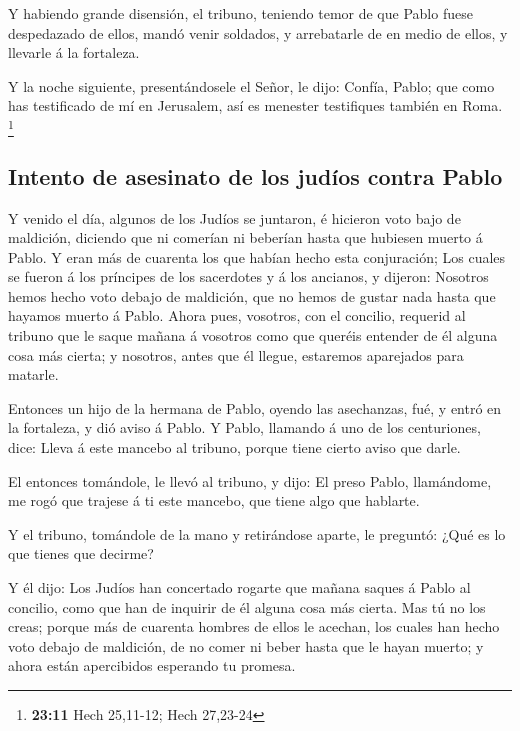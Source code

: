  Y habiendo grande disensión, el tribuno, teniendo temor de
que Pablo fuese despedazado de ellos, mandó venir soldados, y
arrebatarle de en medio de ellos, y llevarle á la fortaleza.

 Y la noche siguiente, presentándosele el Señor, le dijo:
Confía, Pablo; que como has testificado de mí en Jerusalem, así es
menester testifiques también en Roma. \footnote{\textbf{23:11} Hech
  25,11-12; Hech 27,23-24}

\hypertarget{intento-de-asesinato-de-los-juduxedos-contra-pablo}{%
\subsection{Intento de asesinato de los judíos contra
Pablo}\label{intento-de-asesinato-de-los-juduxedos-contra-pablo}}

 Y venido el día, algunos de los Judíos se juntaron, é
hicieron voto bajo de maldición, diciendo que ni comerían ni beberían
hasta que hubiesen muerto á Pablo.  Y eran más de cuarenta
los que habían hecho esta conjuración;  Los cuales se
fueron á los príncipes de los sacerdotes y á los ancianos, y dijeron:
Nosotros hemos hecho voto debajo de maldición, que no hemos de gustar
nada hasta que hayamos muerto á Pablo.  Ahora pues,
vosotros, con el concilio, requerid al tribuno que le saque mañana á
vosotros como que queréis entender de él alguna cosa más cierta; y
nosotros, antes que él llegue, estaremos aparejados para matarle.

 Entonces un hijo de la hermana de Pablo, oyendo las
asechanzas, fué, y entró en la fortaleza, y dió aviso á Pablo.
 Y Pablo, llamando á uno de los centuriones, dice: Lleva á
este mancebo al tribuno, porque tiene cierto aviso que darle.

 El entonces tomándole, le llevó al tribuno, y dijo: El
preso Pablo, llamándome, me rogó que trajese á ti este mancebo, que
tiene algo que hablarte.

 Y el tribuno, tomándole de la mano y retirándose aparte,
le preguntó: ¿Qué es lo que tienes que decirme?

 Y él dijo: Los Judíos han concertado rogarte que mañana
saques á Pablo al concilio, como que han de inquirir de él alguna cosa
más cierta.  Mas tú no los creas; porque más de cuarenta
hombres de ellos le acechan, los cuales han hecho voto debajo de
maldición, de no comer ni beber hasta que le hayan muerto; y ahora están
apercibidos esperando tu promesa.


